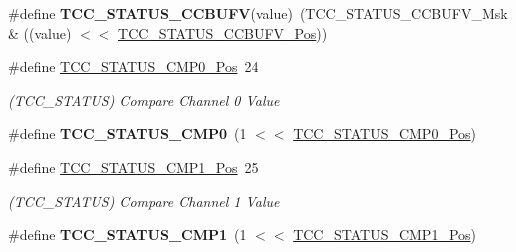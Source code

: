 \begin{DoxyCompactItemize}
\item 
\hypertarget{group___s_a_m_l21___t_c_c_ga00feb7e3089d615957e2a25e02692880}{}\#define {\bfseries T\+C\+C\+\_\+\+S\+T\+A\+T\+U\+S\+\_\+\+C\+C\+B\+U\+F\+V}(value)~(T\+C\+C\+\_\+\+S\+T\+A\+T\+U\+S\+\_\+\+C\+C\+B\+U\+F\+V\+\_\+\+Msk \& ((value) $<$$<$ \hyperlink{group___s_a_m_l21___t_c_c_gae45835d62a6b59413e04a2914c8ca9ce}{T\+C\+C\+\_\+\+S\+T\+A\+T\+U\+S\+\_\+\+C\+C\+B\+U\+F\+V\+\_\+\+Pos}))\label{group___s_a_m_l21___t_c_c_ga00feb7e3089d615957e2a25e02692880}

\item 
\hypertarget{group___s_a_m_l21___t_c_c_gaf2ee6e0b8314586d16f682d80eec08b0}{}\#define \hyperlink{group___s_a_m_l21___t_c_c_gaf2ee6e0b8314586d16f682d80eec08b0}{T\+C\+C\+\_\+\+S\+T\+A\+T\+U\+S\+\_\+\+C\+M\+P0\+\_\+\+Pos}~24\label{group___s_a_m_l21___t_c_c_gaf2ee6e0b8314586d16f682d80eec08b0}

\begin{DoxyCompactList}\small\item\em (T\+C\+C\+\_\+\+S\+T\+A\+T\+U\+S) Compare Channel 0 Value \end{DoxyCompactList}\item 
\hypertarget{group___s_a_m_l21___t_c_c_gaef94649ddbef1afe8375fe8f14260fc8}{}\#define {\bfseries T\+C\+C\+\_\+\+S\+T\+A\+T\+U\+S\+\_\+\+C\+M\+P0}~(1 $<$$<$ \hyperlink{group___s_a_m_l21___t_c_c_gaf2ee6e0b8314586d16f682d80eec08b0}{T\+C\+C\+\_\+\+S\+T\+A\+T\+U\+S\+\_\+\+C\+M\+P0\+\_\+\+Pos})\label{group___s_a_m_l21___t_c_c_gaef94649ddbef1afe8375fe8f14260fc8}

\item 
\hypertarget{group___s_a_m_l21___t_c_c_ga033686f10c7210fd1963053e50badb3f}{}\#define \hyperlink{group___s_a_m_l21___t_c_c_ga033686f10c7210fd1963053e50badb3f}{T\+C\+C\+\_\+\+S\+T\+A\+T\+U\+S\+\_\+\+C\+M\+P1\+\_\+\+Pos}~25\label{group___s_a_m_l21___t_c_c_ga033686f10c7210fd1963053e50badb3f}

\begin{DoxyCompactList}\small\item\em (T\+C\+C\+\_\+\+S\+T\+A\+T\+U\+S) Compare Channel 1 Value \end{DoxyCompactList}\item 
\hypertarget{group___s_a_m_l21___t_c_c_gae2f487cd343c01cee94e6c41e8ff8f02}{}\#define {\bfseries T\+C\+C\+\_\+\+S\+T\+A\+T\+U\+S\+\_\+\+C\+M\+P1}~(1 $<$$<$ \hyperlink{group___s_a_m_l21___t_c_c_ga033686f10c7210fd1963053e50badb3f}{T\+C\+C\+\_\+\+S\+T\+A\+T\+U\+S\+\_\+\+C\+M\+P1\+\_\+\+Pos})\label{group___s_a_m_l21___t_c_c_gae2f487cd343c01cee94e6c41e8ff8f02}


\end{DoxyCompactItemize}
